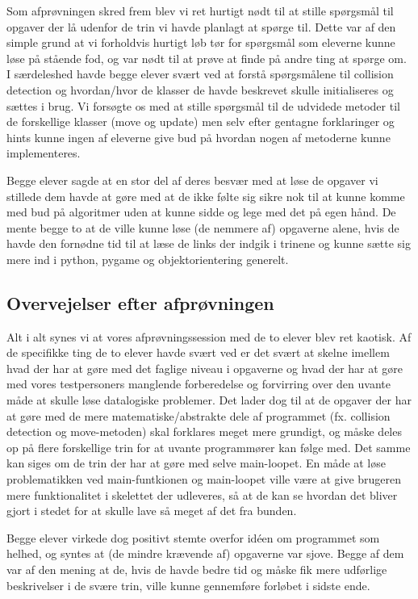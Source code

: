 \documentclass[10pt,a4paper,danish]{article}
\begin{document}
Som afprøvningen skred frem blev vi ret hurtigt nødt til at stille spørgsmål til 
opgaver der lå udenfor de trin vi havde planlagt at spørge til. Dette var af den 
simple grund at vi forholdvis hurtigt løb tør for spørgsmål som eleverne kunne løse
på stående fod, og var nødt til at prøve at finde på andre ting at spørge om. I særdeleshed
havde begge elever svært ved at forstå spørgsmålene til collision detection og 
hvordan/hvor de klasser de havde beskrevet skulle initialiseres og sættes i brug. Vi 
forsøgte os med at stille spørgsmål til de udvidede metoder til de forskellige klasser
(move og update) men selv efter gentagne forklaringer og hints kunne
ingen af eleverne give bud på hvordan nogen af metoderne kunne implementeres. 

Begge elever sagde at en stor del af deres besvær med at løse de opgaver
vi stillede dem havde at gøre med at de ikke følte sig sikre nok til at kunne
komme med bud på algoritmer uden at kunne sidde og lege med det på egen hånd.
De mente begge to at de ville kunne løse (de nemmere af) opgaverne alene, hvis
de havde den fornødne tid til at læse de links der indgik i trinene og kunne
sætte sig mere ind i python, pygame og objektorientering generelt. 


\subsection{Overvejelser efter afprøvningen}
Alt i alt synes vi at vores afprøvningssession med de to elever blev ret kaotisk.
Af de specifikke ting de to elever havde svært ved er det svært at skelne imellem
hvad der har at gøre med det faglige niveau i opgaverne og hvad der har at gøre med
vores testpersoners manglende forberedelse og forvirring over den uvante måde at 
skulle løse datalogiske problemer. Det lader dog til at de opgaver der har at gøre
med de mere matematiske/abstrakte dele af programmet (fx. collision detection og move-metoden)
skal forklares meget mere grundigt, og måske deles op på flere forskellige trin for
at uvante programmører kan følge med. Det samme kan siges om de trin der har at gøre 
med selve main-loopet. En måde at løse problematikken ved main-funtkionen og main-loopet
ville være at give brugeren mere funktionalitet i skelettet der udleveres, så at 
de kan se hvordan det bliver gjort i stedet for at skulle lave så meget af det
fra bunden. 

Begge elever virkede dog positivt stemte overfor idéen om programmet som helhed, 
og syntes at (de mindre krævende af) opgaverne var sjove. Begge af dem var af den 
mening at de, hvis de havde bedre tid og måske fik mere udførlige beskrivelser i de 
svære trin, ville kunne gennemføre forløbet i sidste ende. 
\end{document}
